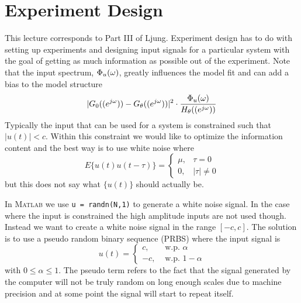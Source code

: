
\mainmatter
\setcounter{page}{1}

\lectureseries[\course]{\course}

\date{December 8, 2009}

\setaddress

\setcounter{lecture}{18}
\setcounter{chapter}{18}


\section{Experiment Design}
This lecture corresponds to Part III of Ljung. Experiment design has to do with setting up experiments and designing input signals for a particular system with the goal of getting as much information as possible out of the experiment. Note that the input spectrum, $\Phi_u(\omega)$, greatly influences the model fit and can add a bias to the model structure
$$|G_0((e^{j\omega}))-G_\theta((e^{j\omega}))|^2 \cdot \frac{\Phi_u(\omega)}{H_\theta((e^{j\omega}))}$$
Typically the input that can be used for a system is constrained such that $|u(t)|<c$. Within this constraint we would like to optimize the information content and the best way is to use white noise where
$$E\{u(t)u(t-\tau)\} = \begin{cases} \mu, & \tau=0 \\ 0, & |\tau|\neq0 \end{cases}$$
but this does not say what $\{u(t)\}$ should actually be.

In \textsc{Matlab} we use \texttt{u = randn(N,1)} to generate a white noise signal. In the case where the input is constrained the high amplitude inputs are not used though. Instead we want to create a white noise signal in the range $[-c,c]$. The solution is to use a pseudo random binary sequence (PRBS) where the input signal is
$$u(t) = \begin{cases} c, & \text{ w.p. } \alpha \\ -c, & \text{ w.p. } 1-\alpha \end{cases}$$
with $0\leq\alpha\leq1$. The pseudo term refers to the fact that the signal generated by the computer will not be truly random on long enough scales due to machine precision and at some point the signal will start to repeat itself.

